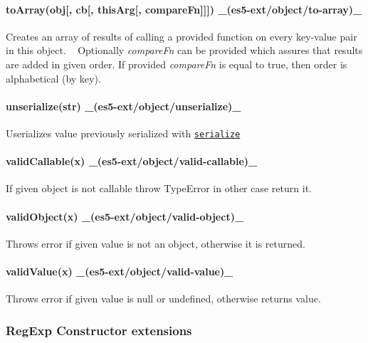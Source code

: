 \paragraph*{to\+Array(obj\mbox{[}, cb\mbox{[}, this\+Arg\mbox{[}, compare\+Fn\mbox{]}\mbox{]}\mbox{]}) \+\_\+(es5-\/ext/object/to-\/array)\+\_\+}

Creates an array of results of calling a provided function on every key-\/value pair in this object. ~\newline
Optionally {\itshape compare\+Fn} can be provided which assures that results are added in given order. If provided {\itshape compare\+Fn} is equal to {\ttfamily true}, then order is alphabetical (by key).

\paragraph*{unserialize(str) \+\_\+(es5-\/ext/object/unserialize)\+\_\+}

Userializes value previously serialized with \href{#serializevalue-es5-extobjectserialize}{\tt serialize}

\paragraph*{valid\+Callable(x) \+\_\+(es5-\/ext/object/valid-\/callable)\+\_\+}

If given object is not callable throw Type\+Error in other case return it.

\paragraph*{valid\+Object(x) \+\_\+(es5-\/ext/object/valid-\/object)\+\_\+}

Throws error if given value is not an object, otherwise it is returned.

\paragraph*{valid\+Value(x) \+\_\+(es5-\/ext/object/valid-\/value)\+\_\+}

Throws error if given value is {\ttfamily null} or {\ttfamily undefined}, otherwise returns value.

\subsubsection*{Reg\+Exp Constructor extensions}

